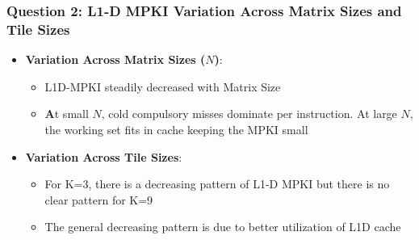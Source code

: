 \documentclass[11pt,a4paper]{article}
\begin{document}
\subsubsection{Question 2: L1-D MPKI Variation Across Matrix Sizes and Tile Sizes}
\begin{itemize}
    \item \textbf{Variation Across Matrix Sizes ($N$)}:
    \begin{itemize}
        \item L1D-MPKI steadily decreased with Matrix Size 
        \item \textbf At small $N$, cold compulsory misses dominate per instruction. At large $N$, the working set fits in cache keeping the MPKI small
    \end{itemize}
    \item \textbf{Variation Across Tile Sizes}:
    \begin{itemize}
        \item For K=3, there is a decreasing pattern of L1-D MPKI but there is no clear pattern for K=9
        \item The general decreasing pattern is due to better utilization of L1D cache 
    \end{itemize}
\end{itemize}
\end{document}
